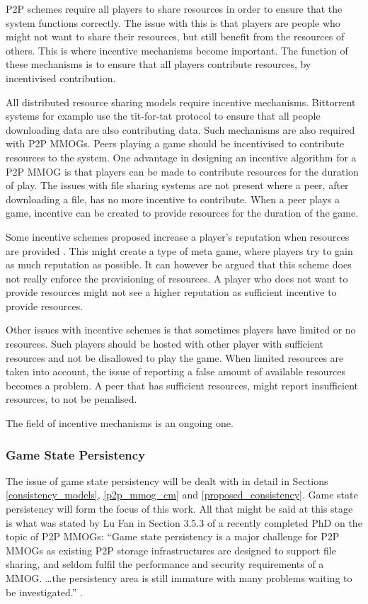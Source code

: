 \documentclass[10pt,a4paper,journal,cspaper,compsoc]{IEEEtran}
\begin{document}
P2P schemes require all players to share resources in order to ensure that the system functions correctly. The issue with this is that players are
people who might not want to share their resources, but still benefit from the resources of others. This is where incentive mechanisms become
important. The function of these mechanisms is to ensure that all players contribute resources, by incentivised contribution.

All distributed resource sharing models require incentive mechanisms. Bittorrent systems for example use the tit-for-tat protocol \cite{tit_for_tat}
to ensure that all people downloading data are also contributing data. Such mechanisms are also required with P2P MMOGs. Peers playing a game should
be incentivised to contribute resources to the system. One advantage in designing an incentive algorithm for a P2P MMOG is that players can be made
to contribute resources for the duration of play. The issues with file sharing systems are not present where a peer, after downloading a file, has no
more incentive to contribute. When a peer plays a game, incentive can be created to provide resources for the duration of the game.

Some incentive schemes proposed increase a player's reputation when resources are provided \cite{classic_p2p_reputation} \cite{proactive_reputation}.
This might create a type of meta game, where players try to gain as much reputation as possible. It can however be argued that this scheme does not
really enforce the provisioning of resources. A player who does not want to provide resources might not see a higher reputation as sufficient
incentive to provide resources.

Other issues with incentive schemes is that sometimes players have limited or no resources. Such players should be hosted with other player with
sufficient resources and not be disallowed to play the game. When limited resources are taken into account, the issue of reporting a false amount of
available resources becomes a problem. A peer that has sufficient resources, might report insufficient resources, to not be penalised.

The field of incentive mechanisms is an ongoing one.

\subsubsection{Game State Persistency}

The issue of game state persistency will be dealt with in detail in Sections \ref{consistency_models}, \ref{p2p_mmog_cm} and
\ref{proposed_consistency}. Game state persistency will form the focus of this work. All that might be said at this stage is what was stated by Lu
Fan in Section 3.5.3 of a recently completed PhD on the topic of P2P MMOGs: ``Game state persistency is a major challenge for P2P MMOGs as existing
P2P storage infrastructures are designed to support file sharing, and seldom fulfil the performance and security requirements of a MMOG. \ldots the
persistency area is still immature with many problems waiting to be investigated.'' \cite{Fan_phd}.
\end{document}
